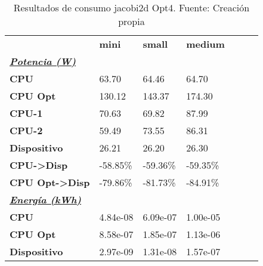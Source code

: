 \begin{table}[H]
    \centering
    \begin{tabular}{lllllll}
    \rowcolor[HTML]{DAE8FC} \ & \textbf{mini} & \textbf{	small} & \textbf{	medium} \\
    \cellcolor[HTML]{DAE8FC} \textbf{\textbf{{\emph{{\underline{{Potencia (W)}}}}}}} &  & 	 & 	 \\
    \rowcolor[HTML]{EFEFEF} \cellcolor[HTML]{DAE8FC} \textbf{CPU} & 63.70 & 	64.46 & 	64.70 \\
    \cellcolor[HTML]{DAE8FC} \textbf{CPU Opt} & 130.12 & 	143.37 & 	174.30 \\
    \rowcolor[HTML]{EFEFEF} \cellcolor[HTML]{DAE8FC} \textbf{\quad CPU-1} & 70.63 & 	69.82 & 	87.99 \\
    \cellcolor[HTML]{DAE8FC} \textbf{\quad CPU-2} & 59.49 & 	73.55 & 	86.31 \\
    \rowcolor[HTML]{EFEFEF} \cellcolor[HTML]{DAE8FC} \textbf{Dispositivo} & 26.21 & 	26.20 & 	26.30 \\
    \cellcolor[HTML]{DAE8FC} \textbf{CPU->Disp} & -58.85\% & 	-59.36\% & 	-59.35\% \\
    \rowcolor[HTML]{EFEFEF} \cellcolor[HTML]{DAE8FC} \textbf{CPU Opt->Disp} & -79.86\% & 	-81.73\% & 	-84.91\% \\
    \cellcolor[HTML]{DAE8FC} \textbf{\textbf{{\emph{{\underline{{Energía (kWh)}}}}}}} &  & 	 & 	 \\
    \rowcolor[HTML]{EFEFEF} \cellcolor[HTML]{DAE8FC} \textbf{CPU} & 4.84e-08 & 	6.09e-07 & 	1.00e-05 \\
    \cellcolor[HTML]{DAE8FC} \textbf{CPU Opt} & 8.58e-07 & 	1.85e-07 & 	1.13e-06 \\
    \rowcolor[HTML]{EFEFEF} \cellcolor[HTML]{DAE8FC} \textbf{Dispositivo} & 2.97e-09 & 	1.31e-08 & 	1.57e-07 \\
    \end{tabular}
    \caption[Resultados de consumo jacobi2d Opt4]{{Resultados de consumo jacobi2d Opt4. Fuente: Creación propia}}
    \label{table_test_jacobi2d_Opt4_hw_powerResults}
\end{table}